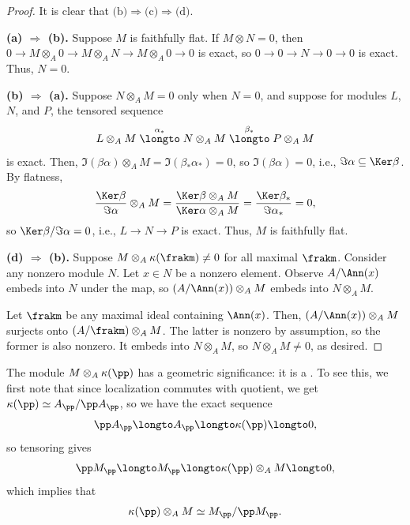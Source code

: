 \begin{proof}
    It is clear that $\text{(b)}\Rightarrow\text{(c)}\Rightarrow\text{(d)}$.

    \textbf{(a) $\Rightarrow$ (b).} Suppose $M$ is faithfully flat. If $M\otimes N=0$, then $0\to M\otimes_A 0\to M\otimes_A N\to M\otimes_A 0\to 0$ is exact, so $0\to 0\to N\to 0\to 0$ is exact. Thus, $N=0$.

    \textbf{(b) $\Rightarrow$ (a).} Suppose $N\otimes_A M=0$ only when $N=0$, and suppose for modules $L$, $N$, and $P$, the tensored sequence \[L\otimes_A M\stackrel{\alpha_*}\longto N\otimes_A M\stackrel{\beta_*}\longto P\otimes_A M\] is exact. Then, $\Im(\beta\alpha)\otimes_A M = \Im(\beta_*\alpha_*)=0$, so $\Im(\beta\alpha) = 0$, i.e., $\Im \alpha\subseteq \Ker \beta$. By flatness, \[\frac{\Ker\beta}{\Im\alpha} \otimes_A M = \frac{\Ker\beta\otimes_A M}{\Ker\alpha\otimes_A M} = \frac{\Ker\beta_*}{\Im\alpha_*} = 0,\] so $\Ker\beta / \Im \alpha = 0$, i.e., $L\to N\to P$ is exact. Thus, $M$ is faithfully flat.

    \textbf{(d) $\Rightarrow$ (b).} Suppose $M\otimes_A \kappa(\frakm) \neq 0$ for all maximal $\frakm$. Consider any nonzero module $N$. Let $x\in N$ be a nonzero element. Observe $A/\Ann(x)$ embeds into $N$ under the map, so $(A/\Ann(x)) \otimes_A M$ embeds into $N\otimes_A M$.
    
    Let $\frakm$ be any maximal ideal containing $\Ann(x)$. Then, $(A/\Ann(x))\otimes_A M$ surjects onto $(A/\frakm)\otimes_A M$. The latter is nonzero by assumption, so the former is also nonzero. It embeds into $N\otimes_A M$, so $N\otimes_A M\neq 0$, as desired.
\end{proof}
The module $M\otimes_A \kappa(\pp)$ has a geometric
significance: it is a .
To see this, we first note that since localization
commutes with quotient, we get 
$\kappa(\pp) \simeq A_\pp/\pp A_\pp$, so we have the 
exact sequence
$$\pp A_\pp \longto A_\pp \longto \kappa(\pp) \longto 0,$$
so tensoring gives
$$\pp M_\pp \longto M_\pp \longto \kappa(\pp)\otimes_A M\longto 0,$$
which implies that
\begin{equation}
\label{eq:fiber}
\kappa(\pp)\otimes_A M \simeq M_\pp / \pp M_\pp.
\end{equation}

